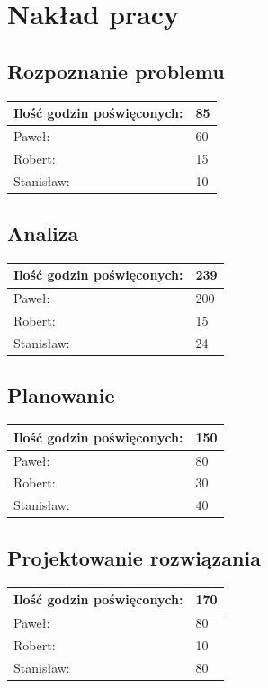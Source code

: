 \documentclass[a4paper,11pt]{report}
\begin{document}
\chapter{Nakład pracy}
\section{Rozpoznanie problemu}
\begin{tabular}{|l|l|}
\hline
Ilość godzin poświęconych: & 85\\
\hline
Paweł: & 60\\
\hline
Robert: & 15\\
\hline
Stanisław: & 10\\
\hline
\end{tabular}

\section{Analiza}
\begin{tabular}{|l|l|}
\hline
Ilość godzin poświęconych: & 239\\
\hline
Paweł: & 200\\
\hline
Robert: & 15\\
\hline
Stanisław: & 24\\
\hline
\end{tabular}

\section{Planowanie}
\begin{tabular}{|l|l|}
\hline
Ilość godzin poświęconych: & 150\\
\hline
Paweł: & 80\\
\hline
Robert: & 30\\
\hline
Stanisław: & 40\\
\hline
\end{tabular}

\section{Projektowanie rozwiązania}
\begin{tabular}{|l|l|}
\hline
Ilość godzin poświęconych: & 170\\
\hline
Paweł: & 80\\
\hline
Robert: & 10\\
\hline
Stanisław: & 80\\
\hline
\end{tabular}
\end{document}
